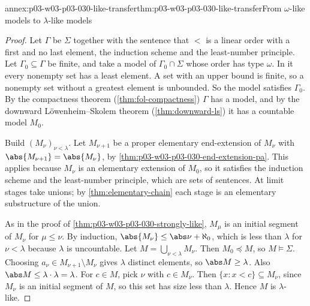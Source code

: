 \begin{annexitem}{annex:p03-w03-p03-030-like-transfer}{thm:p03-w03-p03-030-like-transfer}{From \(\omega\)-like models to \(\lambda\)-like models}
\begin{proof}
Let \(\Gamma\) be \(\Sigma\) together with the sentence that \(<\) is a linear
order with a first and no last element, the induction scheme and the
least-number principle.  Let \(\Gamma_0\subseteq\Gamma\) be finite, and take a
model of \(\Gamma_0\cap\Sigma\) whose order has type \(\omega\).  In it every
nonempty set has a least element.  A set with an upper bound is finite, so a
nonempty set without a greatest element is unbounded.  So the model
satisfies \(\Gamma_0\).  By the compactness theorem
(\cref{thm:fol-compactness}) \(\Gamma\) has a model, and by the downward
L\"owenheim--Skolem theorem (\cref{thm:downward-ls}) it has a countable
model \(M_0\).

Build \((M_\nu)_{\nu<\lambda}\).  Let \(M_{\nu+1}\) be a proper elementary
end-extension of \(M_\nu\) with \(\abs{M_{\nu+1}}=\abs{M_\nu}\), by
\cref{thm:p03-w03-p03-030-end-extension-pa}.  This applies because
\(M_\nu\) is an elementary extension of \(M_0\), so it satisfies the
induction scheme and the least-number principle, which are sets of
sentences.  At limit stages take unions; by \cref{thm:elementary-chain} each
stage is an elementary substructure of the union.

As in the proof of \cref{thm:p03-w03-p03-030-strongly-like}, \(M_\mu\) is an
initial segment of \(M_\nu\) for \(\mu\le\nu\).  By induction,
\(\abs{M_\nu}\le\abs\nu+\aleph_0\), which is less than \(\lambda\) for
\(\nu<\lambda\) because \(\lambda\) is uncountable.  Let
\(M=\bigcup_{\nu<\lambda}M_\nu\).  Then \(M_0\preccurlyeq M\), so
\(M\models\Sigma\).  Choosing \(a_\nu\in M_{\nu+1}\setminus M_\nu\) gives
\(\lambda\) distinct elements, so \(\abs M\ge\lambda\).  Also
\(\abs M\le\lambda\cdot\lambda=\lambda\).  For \(c\in M\), pick \(\nu\) with
\(c\in M_\nu\).  Then \(\{x:x<c\}\subseteq M_\nu\), since \(M_\nu\) is an
initial segment of \(M\), so this set has size less than \(\lambda\).  Hence
\(M\) is \(\lambda\)-like.
\end{proof}
\end{annexitem}


